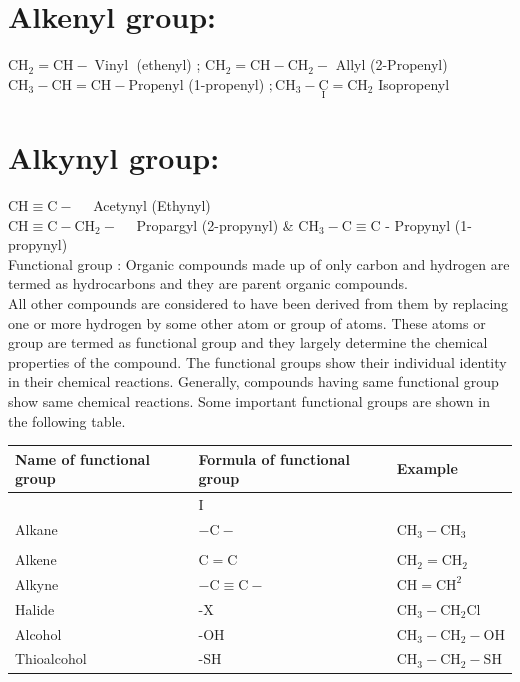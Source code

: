 \documentclass[10pt]{article}
\begin{document}
\section*{Alkenyl group:}
$\mathrm{CH}_{2}=\mathrm{CH}-\operatorname{Vinyl}$ (ethenyl) ; $\mathrm{CH}_{2}=\mathrm{CH}-\mathrm{CH}_{2}-$ Allyl (2-Propenyl)\\
$\mathrm{CH}_{3}-\mathrm{CH}=\mathrm{CH}-\mathrm{Propenyl}$ (1-propenyl) $; \mathrm{CH}_{3}-\underset{\text { I }}{\mathrm{C}}=\mathrm{CH}_{2}$ Isopropenyl

\section*{Alkynyl group:}
$\mathrm{CH} \equiv \mathrm{C}-\quad$ Acetynyl (Ethynyl)\\
$\mathrm{CH} \equiv \mathrm{C}-\mathrm{CH}_{2}-\quad$ Propargyl (2-propynyl) \& $\mathrm{CH}_{3}-\mathrm{C} \equiv \mathrm{C}$ - Propynyl (1-propynyl)\\
Functional group : Organic compounds made up of only carbon and hydrogen are termed as hydrocarbons and they are parent organic compounds.\\
All other compounds are considered to have been derived from them by replacing one or more hydrogen by some other atom or group of atoms. These atoms or group are termed as functional group and they largely determine the chemical properties of the compound. The functional groups show their individual identity in their chemical reactions. Generally, compounds having same functional group show same chemical reactions. Some important functional groups are shown in the following table.

\begin{center}
\begin{tabular}{|l|l|l|}
\hline
Name of functional group & Formula of functional group & Example \\
\hline
 & I &  \\
Alkane & $-\mathrm{C}-$ & $\mathrm{CH}_{3}-\mathrm{CH}_{3}$ \\
 &  &  \\
Alkene & $\mathrm{C}=\mathrm{C}$ & $\mathrm{CH}_{2}=\mathrm{CH}_{2}$ \\
Alkyne & $-\mathrm{C} \equiv \mathrm{C}-$ & $\mathrm{CH}=\mathrm{CH}^{2}$ \\
Halide & -X & $\mathrm{CH}_{3}-\mathrm{CH}_{2} \mathrm{Cl}$ \\
Alcohol & -OH & $\mathrm{CH}_{3}-\mathrm{CH}_{2}-\mathrm{OH}$ \\
Thioalcohol & -SH & $\mathrm{CH}_{3}-\mathrm{CH}_{2}-\mathrm{SH}$ \\
\hline
\end{tabular}
\end{center}
\end{document}
